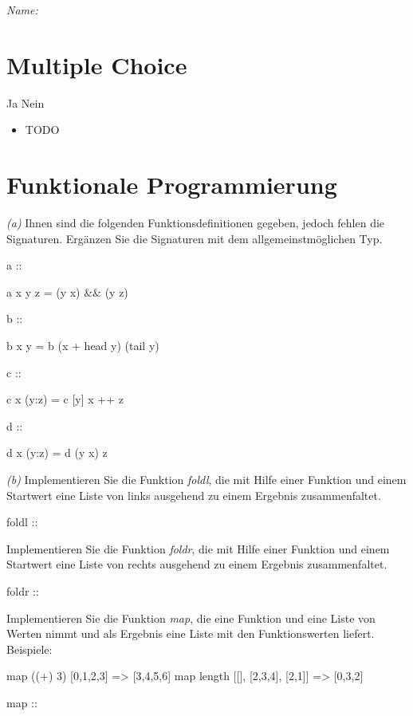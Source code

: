 \documentclass[11pt,a4paper,oneside,ngerman]{scrbook}
\begin{document}
\emph{Name:} \hrulefill


\section{Multiple Choice}
Ja Nein
\begin{itemize}[label={\Square \ \Square}]
\item TODO
\end{itemize}


\newpage

\section{Funktionale Programmierung}


\emph{(a)} Ihnen sind die folgenden Funktionsdefinitionen gegeben, jedoch fehlen die Signaturen. Ergänzen Sie die Signaturen mit dem allgemeinstmöglichen Typ.
\begin{code}
  a :: 

  a x y z = (y x) && (y z)

  
  b :: 
  
  b x y = b (x + head y) (tail y)

  
  c ::
  
  c x (y:z) = c [y] x ++ z

  
  d ::
  
  d x (y:z) = d (y x) z
\end{code}



\emph{(b)} Implementieren Sie die Funktion \emph{foldl}, die mit Hilfe einer Funktion und einem Startwert eine Liste von links ausgehend zu einem Ergebnis zusammenfaltet.

\begin{code}
  foldl :: 


\end{code}

Implementieren Sie die Funktion \emph{foldr}, die mit Hilfe einer Funktion und einem Startwert eine Liste von rechts ausgehend zu einem Ergebnis zusammenfaltet.

\begin{code}
  foldr :: 


\end{code}

Implementieren Sie die Funktion \emph{map}, die eine Funktion und eine Liste von Werten nimmt und als Ergebnis eine Liste mit den Funktionswerten liefert. Beispiele:
\begin{code}
  map ((+) 3) [0,1,2,3]             => [3,4,5,6]
  map length [[], [2,3,4], [2,1]]   => [0,3,2]

  map :: 


\end{code}
\end{document}
